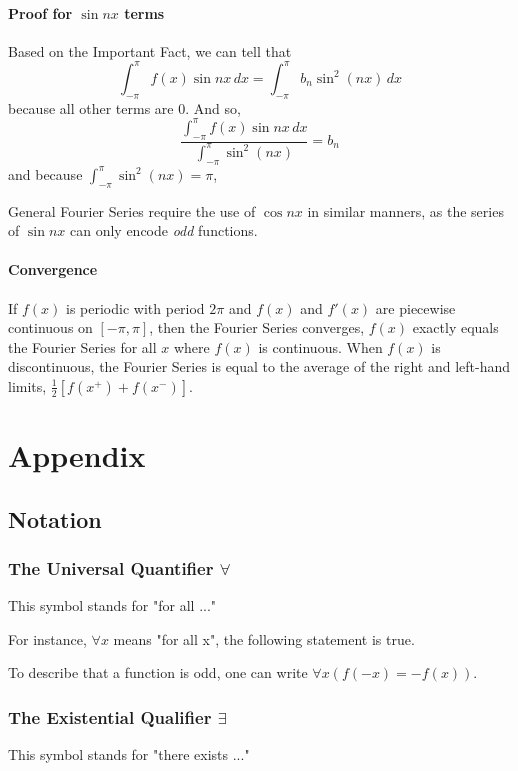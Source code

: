 \documentclass{article}
\begin{document}
\paragraph{Proof for $\sin{nx}$ terms}
Based on the Important Fact, we can tell that
$$\int_{-\pi}^\pi f(x)\sin{nx}\,dx=\int_{-\pi}^\pi b_n \sin^2{\left(nx\right)}\,dx$$ because all other terms are $0$. And so,
$$\frac{\int_{-\pi}^\pi f(x)\sin{nx}\,dx}{\int_{-\pi}^\pi\sin^2{\left(nx\right)}}= b_n$$ and because $\int_{-\pi}^\pi\sin^2{\left(nx\right)}=\pi$,

General Fourier Series require the use of $\cos{nx}$ in similar manners, as the series of $\sin{nx}$ can only encode \emph{odd} functions.

\paragraph{Convergence}
If $f(x)$ is periodic with period $2\pi$ and $f(x)$ and $f'(x)$ are piecewise continuous on $[-\pi,\pi]$, then the Fourier Series converges, $f(x)$ exactly equals the Fourier Series for all $x$ where $f(x)$ is continuous. When $f(x)$ is discontinuous, the Fourier Series is equal to the average of the right and left-hand limits, $\frac{1}{2}\left[f(x^+)+f(x^-)\right]$.

\section{Appendix}
\subsection{Notation}
\subsubsection{\texorpdfstring{The Universal Quantifier $\forall$}{The Universal Quantifier}}
This symbol stands for "for all ..."

For instance, $\forall x$ means "for all x", the following statement is true.

To describe that a function is odd, one can write $\forall x \left(f\left(-x\right) = -f\left(x\right)\right)$.

\subsubsection{\texorpdfstring{The Existential Qualifier $\exists$}{The Existential Qualifier}}
This symbol stands for "there exists ..."
\end{document}
